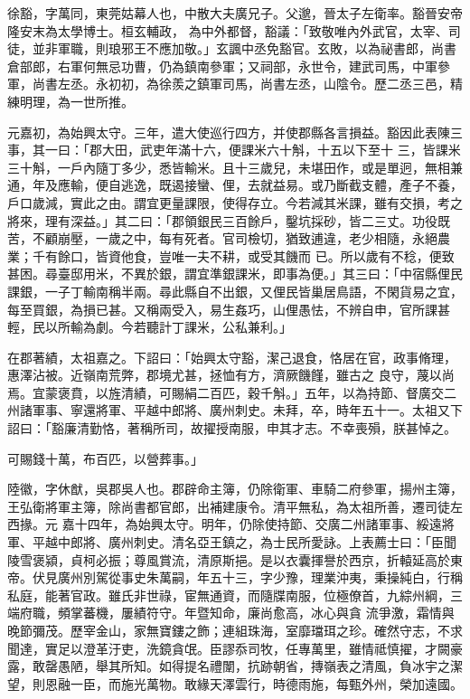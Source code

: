 \begin{pinyinscope}
 徐豁，字萬同，東莞姑幕人也，中散大夫廣兄子。父邈，晉太子左衛率。豁晉安帝隆安末為太學博士。桓玄輔政，
 為中外都督，豁議：「致敬唯內外武官，太宰、司徒，並非軍職，則琅邪王不應加敬。」玄諷中丞免豁官。玄敗，以為祕書郎，尚書倉部郎，右軍何無忌功曹，仍為鎮南參軍；又祠部，永世令，建武司馬，中軍參軍，尚書左丞。永初初，為徐羨之鎮軍司馬，尚書左丞，山陰令。歷二丞三邑，精練明理，為一世所推。



 元嘉初，為始興太守。三年，遣大使巡行四方，并使郡縣各言損益。豁因此表陳三事，其一曰：「郡大田，武吏年滿十六，便課米六十斛，十五以下至十
 三，皆課米三十斛，一戶內隨丁多少，悉皆輸米。且十三歲兒，未堪田作，或是單迥，無相兼通，年及應輸，便自逃逸，既遏接蠻、俚，去就益易。或乃斷截支體，產子不養，戶口歲減，實此之由。謂宜更量課限，使得存立。今若減其米課，雖有交損，考之將來，理有深益。」其二曰：「郡領銀民三百餘戶，鑿坑採砂，皆二三丈。功役既苦，不顧崩壓，一歲之中，每有死者。官司檢切，猶致逋違，老少相隨，永絕農業；千有餘口，皆資他食，豈唯一夫不耕，或受其饑而
 已。所以歲有不稔，便致甚困。尋臺邸用米，不異於銀，謂宜準銀課米，即事為便。」其三曰：「中宿縣俚民課銀，一子丁輸南稱半兩。尋此縣自不出銀，又俚民皆巢居鳥語，不閑貨易之宜，每至買銀，為損已甚。又稱兩受入，易生姦巧，山俚愚怯，不辨自申，官所課甚輕，民以所輸為劇。今若聽計丁課米，公私兼利。」



 在郡著績，太祖嘉之。下詔曰：「始興太守豁，潔己退食，恪居在官，政事脩理，惠澤沾被。近嶺南荒弊，郡境尤甚，拯恤有方，濟厥饑饉，雖古之
 良守，蔑以尚焉。宜蒙褒賁，以旌清績，可賜絹二百匹，穀千斛。」五年，以為持節、督廣交二州諸軍事、寧還將軍、平越中郎將、廣州刺史。未拜，卒，時年五十一。太祖又下詔曰：「豁廉清勤恪，著稱所司，故擢授南服，申其才志。不幸喪殞，朕甚悼之。



 可賜錢十萬，布百匹，以營葬事。」



 陸徽，字休猷，吳郡吳人也。郡辟命主簿，仍除衛軍、車騎二府參軍，揚州主簿，王弘衛將軍主簿，除尚書都官郎，出補建康令。清平無私，為太祖所善，遷司徒左西掾。元
 嘉十四年，為始興太守。明年，仍除使持節、交廣二州諸軍事、綏遠將軍、平越中郎將、廣州刺史。清名亞王鎮之，為士民所愛詠。上表薦士曰：「臣聞陵雪褒潁，貞柯必振；尊風賞流，清原斯挹。是以衣囊揮譽於西京，折轅延高於東帝。伏見廣州別駕從事史朱萬嗣，年五十三，字少豫，理業沖夷，秉操純白，行稱私庭，能著官政。雖氏非世祿，宦無通資，而隨牒南服，位極僚首，九綜州綱，三端府職，頻掌蕃機，屢績符守。年暨知命，廉尚愈高，冰心與貪
 流爭激，霜情與晚節彌茂。歷宰金山，家無寶鏤之飾；連組珠海，室靡璫珥之珍。確然守志，不求聞達，實足以澄革汙吏，洗鏡貪氓。臣謬忝司牧，任專萬里，雖情祗慎擢，才闕豪露，敢罄愚陋，舉其所知。如得提名禮闈，抗跡朝省，摶嶺表之清風，負冰宇之潔望，則恩融一臣，而施光萬物。敢緣天澤雲行，時德雨施，每甄外州，榮加遠國。




\end{pinyinscope}
